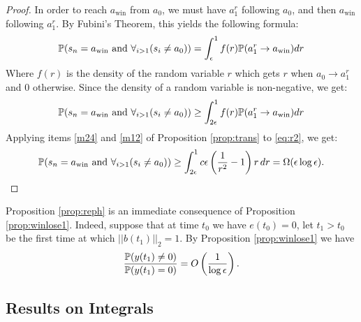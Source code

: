 {{\begin{proof}
 In order to reach $a_\text{win}$ from $a_0$, we must have $a_1^r$ following $a_0$, and then $a_\text{win}$
  following $a_1^r$. By Fubini's Theorem, this yields the following formula:
 \begin{equation}\label{eq:r1}
 \P(s_n=a_\text{win} \text{ and } \ds\forall_{i>1}(s_i\neq a_0))=\ds\int_{\epsilon}^1 f(r) \P(a^r_1\rightarrow a_\text{win}) dr
 \end{equation}
 Where $f(r)$ is the density of the random variable $r$ which gets $r$ when
 $a_0\rightarrow a^r_1$ and $0$ otherwise. Since the density of a random variable is non-negative, we get:
 \begin{equation}\label{eq:r2}
 \P(s_n=a_\text{win} \text{ and } \ds\forall_{i>1}(s_i\neq a_0))\ge\ds\int_{2\epsilon}^1 f(r) \P(a^r_1\rightarrow a_\text{win}) dr
 \end{equation}
Applying items \ref{m24} and \ref{m12} of Proposition \ref{prop:trans} to \eqref{eq:r2}, we get:
\begin{equation}\label{eq:r3}
 \P(s_n=a_\text{win} \text{ and } \ds\forall_{i>1}(s_i\neq a_0))\ge \ds\int_{2\epsilon}^1 c\epsilon\left(\frac{1}{r^2}-1\right)r\, dr = \Omega(\epsilon\log\epsilon).
\end{equation}
\end{proof}

Proposition \ref{prop:reph} is an immediate consequence of Proposition
\ref{prop:winlose1}. Indeed, suppose that at time $t_0$ we have
$e(t_0)=0$, let $t_1>t_0$ be the first time at which $||b(t_1)||_2=1$.
By Proposition \ref{prop:winlose1} we have
$$\frac{\P (y(t_1)\neq0)}{\P (y(t_1)=0)}=O\left(\frac 1 {\log\epsilon}\right).$$
}

\subsection{Results on Integrals}\label{sec:ROI}

}
